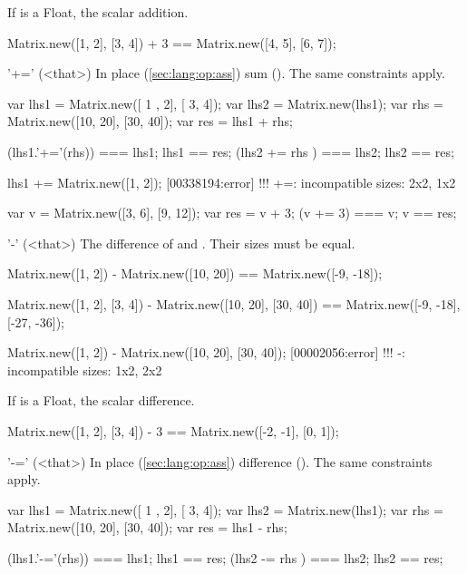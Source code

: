 \begin{urbiscriptapi}
  If \that is a Float, the scalar addition.
\begin{urbiassert}
Matrix.new([1, 2], [3, 4]) + 3 == Matrix.new([4, 5], [6, 7]);
\end{urbiassert}


\item['+='](<that>)%
  In place (\autoref{sec:lang:op:ass}) sum ().  The same
  constraints apply.
\begin{urbiassert}
var lhs1 = Matrix.new([ 1 , 2], [ 3,  4]);
var lhs2 = Matrix.new(lhs1);
var rhs = Matrix.new([10, 20], [30, 40]);
var res = lhs1 + rhs;

(lhs1.'+='(rhs)) === lhs1;  lhs1 == res;
(lhs2  +=  rhs ) === lhs2;  lhs2 == res;

lhs1 += Matrix.new([1, 2]);
[00338194:error] !!! +=: incompatible sizes: 2x2, 1x2
\end{urbiassert}

\begin{urbiassert}
var v = Matrix.new([3, 6], [9, 12]);
var res = v + 3;
(v += 3) === v; v == res;
\end{urbiassert}


\item['-'](<that>)%
  The difference of \this and \that.  Their sizes must be equal.
\begin{urbiassert}
Matrix.new([1, 2]) - Matrix.new([10, 20])
  == Matrix.new([-9, -18]);

Matrix.new([1, 2], [3, 4]) - Matrix.new([10, 20], [30, 40])
  == Matrix.new([-9, -18], [-27, -36]);

Matrix.new([1, 2]) - Matrix.new([10, 20], [30, 40]);
[00002056:error] !!! -: incompatible sizes: 1x2, 2x2
\end{urbiassert}

  If \that is a Float, the scalar difference.
\begin{urbiassert}
Matrix.new([1, 2], [3, 4]) - 3 == Matrix.new([-2, -1], [0, 1]);
\end{urbiassert}


\item['-='](<that>)%
  In place (\autoref{sec:lang:op:ass}) difference ().  The same
  constraints apply.
\begin{urbiassert}
var lhs1 = Matrix.new([ 1 , 2], [ 3,  4]);
var lhs2 = Matrix.new(lhs1);
var rhs = Matrix.new([10, 20], [30, 40]);
var res = lhs1 - rhs;

(lhs1.'-='(rhs)) === lhs1;  lhs1 == res;
(lhs2  -=  rhs ) === lhs2;  lhs2 == res;


\end{urbiassert}
\end{urbiscriptapi}
